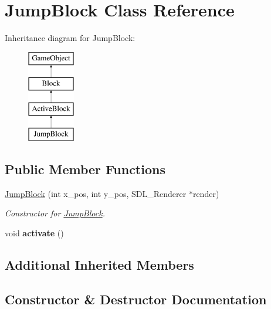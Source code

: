 \hypertarget{class_jump_block}{}\section{Jump\+Block Class Reference}
\label{class_jump_block}
Inheritance diagram for Jump\+Block\+:\begin{figure}[H]
\begin{center}
\leavevmode
\includegraphics[height=4.000000cm]{class_jump_block}
\end{center}
\end{figure}
\subsection*{Public Member Functions}
\begin{DoxyCompactItemize}
\item 
\hyperlink{class_jump_block_a298527515f74ffcc932b273805110143}{Jump\+Block} (int x\+\_\+pos, int y\+\_\+pos, S\+D\+L\+\_\+\+Renderer $\ast$render)
\begin{DoxyCompactList}\small\item\em Constructor for \hyperlink{class_jump_block}{Jump\+Block}. \end{DoxyCompactList}\item 
\hypertarget{class_jump_block_a1b818f8054c1d0ddee4de45e5b6683d0}{}void {\bfseries activate} ()\label{class_jump_block_a1b818f8054c1d0ddee4de45e5b6683d0}

\end{DoxyCompactItemize}
\subsection*{Additional Inherited Members}


\subsection{Constructor \& Destructor Documentation}
\hypertarget{class_jump_block_a298527515f74ffcc932b273805110143}{}
